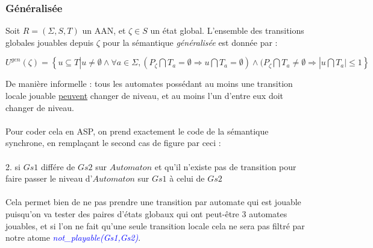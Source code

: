 \documentclass[12pt,a4paper]{article}
\begin{document}
\subsubsection{Généralisée}
Soit $R = (\Sigma,S,T)$ un AAN, et $\zeta\in S$ un état global. L'ensemble des transitions globales jouables depuis $\zeta$ pour la sémantique \emph{généralisée} est donnée par :
\begin{center}
	$U^{gen}(\zeta)=\left\{u\subseteq T|u \neq \emptyset \wedge \forall a\in\Sigma,(P_{\zeta}\bigcap T_a = \emptyset \Rightarrow u\bigcap 
	T_a=\emptyset)\wedge(P_{\zeta}\bigcap T_a\neq\emptyset\Rightarrow |u\bigcap T_a |\leq 1\right\}$
\end{center}
De manière informelle : tous les automates possédant au moins une transition locale jouable \underline{peuvent} changer de niveau, et au moins l'un d'entre eux doit changer de niveau.\\ \\
Pour coder cela en ASP, on prend exactement le code de la sémantique synchrone, en remplaçant le second cas de figure par ceci :\\ \\
2. si $Gs1$ différe de $Gs2$ sur $Automaton$ et qu'il n'existe pas de transition pour faire passer le niveau d'$Automaton$ sur $Gs1$ à celui de $Gs2$\\ \\
Cela permet bien de ne pas prendre une transition par automate qui est jouable puisqu'on va tester des paires d'états globaux qui ont peut-être 3 automates jouables, et si l'on ne fait qu'une seule transition locale cela ne sera pas 
filtré par notre atome \emph{\textcolor{blue}{not\_playable(Gs1,Gs2)}}.
\end{document}
